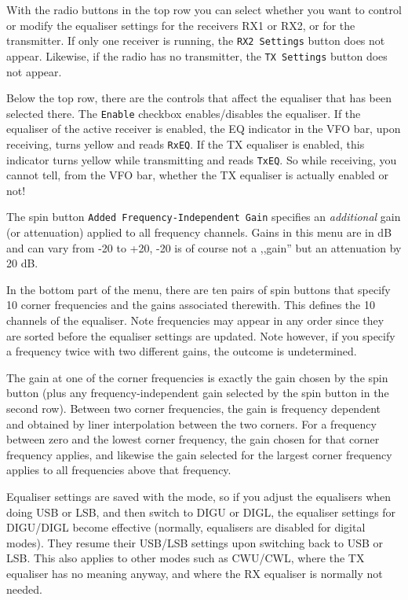 \documentclass[12pt]{book}
\def\rett#1{\texttt{\color{red}#1}}
\begin{document}
With the radio buttons in the top row you can select
whether you want to control or modify the equaliser settings for the receivers
RX1 or RX2, or for the transmitter. If only one receiver is running,
the \rett{RX2 Settings} button does not appear. Likewise, if the radio
has no transmitter, the \rett{TX Settings} button does not appear.

Below the  top row, there are the controls that affect the equaliser
that has been selected there.
The \rett{Enable} checkbox enables/disables the equaliser.
If the equaliser of the active receiver
is enabled, the EQ indicator in the
VFO bar, upon receiving, turns yellow and reads \rett{RxEQ}.
If the TX equaliser is enabled, this indicator turns yellow
while transmitting and reads \rett{TxEQ}. So while receiving,
you cannot tell, from the VFO bar, whether the TX equaliser is
actually enabled or not!

The spin button \rett{Added Frequency-Independent Gain} specifies
an \textit{additional} gain (or attenuation) applied to all frequency
channels. Gains in this menu are in dB and can vary from -20 to +20,
-20 is of course  not a ,,gain'' but an attenuation by 20 dB.

In the bottom part of the menu, there are ten pairs of spin buttons
that specify 10 corner frequencies and the gains associated therewith.
 This defines the 10 channels
of the equaliser. Note frequencies may appear in any order since they
are sorted before the equaliser settings are updated. Note however,
if you specify a frequency twice with two different gains, the outcome
is undetermined.

The gain at one of the   corner frequencies is exactly the gain
chosen by the spin button (plus any frequency-independent gain
selected by the spin button in the second row). Between two
corner frequencies, the gain is frequency dependent and obtained
by liner interpolation between the two corners. For a frequency
between  zero and the lowest corner frequency, the gain chosen for that corner
frequency applies, and likewise the gain selected for the largest corner frequency
applies to all frequencies above that frequency.

Equaliser settings are saved with the mode, so
if you adjust the equalisers when doing USB or LSB, and then switch to
DIGU or DIGL, the equaliser settings for DIGU/DIGL become effective
(normally, equalisers are disabled for digital modes).
They resume their USB/LSB
settings upon switching back to USB or LSB. This also applies to other
modes such as CWU/CWL, where the TX equaliser has no meaning
anyway, and where the RX equaliser is normally not needed.
\end{document}
